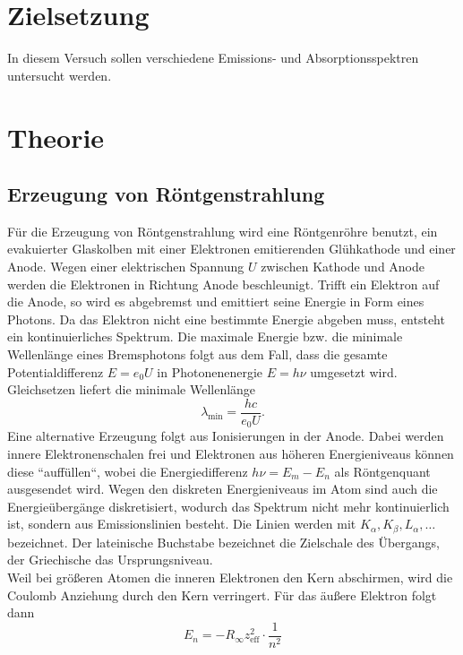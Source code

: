 \section*{Zielsetzung}
\label{sec:Zielsetzung}
In diesem Versuch sollen verschiedene Emissions- und Absorptionsspektren untersucht
werden.

\section{Theorie}
\label{sec:Theorie}
\subsection{Erzeugung von Röntgenstrahlung}
\label{sec:Erzeugung von Röntgenstrahlung}
Für die Erzeugung von Röntgenstrahlung wird eine Röntgenröhre benutzt, ein evakuierter
Glaskolben mit einer Elektronen emitierenden Glühkathode und einer Anode. Wegen einer
elektrischen Spannung $U$ zwischen Kathode und Anode werden die Elektronen in Richtung Anode
beschleunigt. Trifft ein Elektron auf die Anode, so wird es abgebremst und emittiert seine
Energie in Form eines Photons. Da das Elektron nicht eine bestimmte Energie abgeben muss,
entsteht ein kontinuierliches Spektrum. Die maximale Energie bzw. die minimale Wellenlänge
eines Bremsphotons folgt aus dem Fall, dass die gesamte Potentialdifferenz $E = e_0 U$ in
Photonenenergie $E = h\nu$ umgesetzt wird. Gleichsetzen liefert die minimale Wellenlänge
\begin{equation}
	\label{eqn:lambda_min}
	\lambda_\text{min} = \frac{hc}{e_0 U}.
\end{equation}
Eine alternative Erzeugung folgt aus Ionisierungen in der Anode. Dabei werden innere
Elektronenschalen frei und Elektronen aus höheren Energieniveaus können diese
``auffüllen``, wobei die Energiedifferenz $h\nu = E_m - E_n$ als Röntgenquant
ausgesendet wird. Wegen den diskreten Energieniveaus im Atom sind auch die
Energieübergänge diskretisiert, wodurch das Spektrum nicht mehr kontinuierlich ist,
sondern aus Emissionslinien besteht. Die Linien werden mit $K_\alpha, K_\beta, L_\alpha,
\hdots$ bezeichnet. Der lateinische Buchstabe bezeichnet die Zielschale des Übergangs, der
Griechische das Ursprungsniveau. 
\\
Weil bei größeren Atomen die inneren Elektronen den Kern abschirmen, wird die Coulomb
Anziehung durch den Kern verringert. Für das äußere Elektron folgt dann
\begin{equation}
	E_n = - R_\infty z_\text{eff}^2 \cdot \frac{1}{n^2}
\end{equation}
